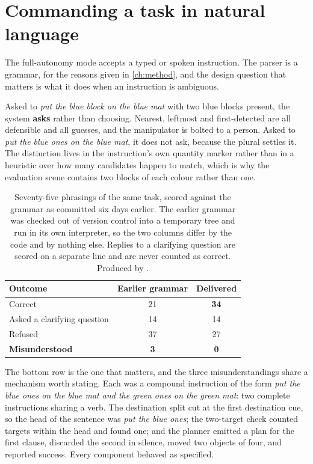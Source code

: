 \section{Commanding a task in natural language}

The full-autonomy mode accepts a typed or spoken instruction. The parser is a
grammar, for the reasons given in \cref{ch:method}, and the design question
that matters is what it does when an instruction is ambiguous.

Asked to \emph{put the blue block on the blue mat} with two blue blocks
present, the system \textbf{asks} rather than choosing. Nearest, leftmost and
first-detected are all defensible and all guesses, and the manipulator is
bolted to a person. Asked to \emph{put the blue ones on the blue mat}, it does
not ask, because the plural settles it. The distinction lives in the
instruction's own quantity marker rather than in a heuristic over how many
candidates happen to match, which is why the evaluation scene contains two
blocks of each colour rather than one.

\begin{table}[htbp]
  \centering
  \caption[Instruction handling]{Seventy-five phrasings of the same task,
  scored against the grammar as committed six days earlier. The earlier
  grammar was checked out of version control into a temporary tree and run in
  its own interpreter, so the two columns differ by the code and by nothing
  else. Replies to a clarifying question are scored on a separate line and are
  never counted as correct. Produced by
  .}
  \label{tab:phrasings}
  \begin{tabular}{@{}lcc@{}}
    \toprule
    Outcome & Earlier grammar & Delivered \\
    \midrule
    Correct & 21 & \textbf{34} \\
    Asked a clarifying question & 14 & 14 \\
    Refused & 37 & 27 \\
    \textbf{Misunderstood} & \textbf{3} & \textbf{0} \\
    \bottomrule
  \end{tabular}
\end{table}

The bottom row is the one that matters, and the three misunderstandings share
a mechanism worth stating. Each was a compound instruction of the form
\emph{put the blue ones on the blue mat and the green ones on the green mat}:
two complete instructions sharing a verb. The destination split cut at the
first destination cue, so the head of the sentence was \emph{put the blue
ones}; the two-target check counted targets within the head and found one; and
the planner emitted a plan for the first clause, discarded the second in
silence, moved two objects of four, and reported success. Every component
behaved as specified.

